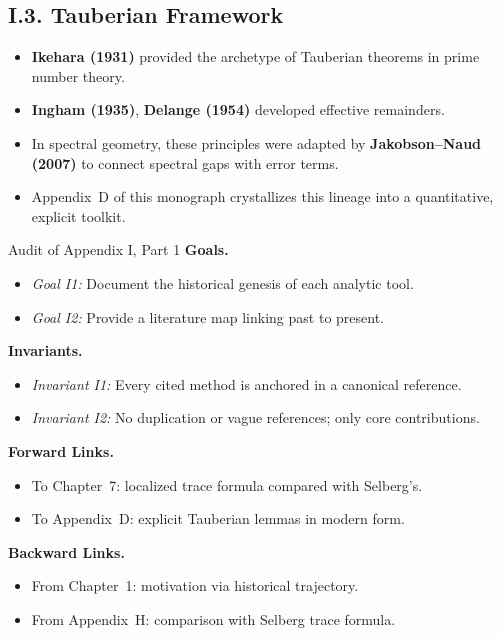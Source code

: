 \subsection*{I.3. Tauberian Framework}  
\begin{itemize}
  \item \textbf{Ikehara (1931)} provided the archetype of Tauberian theorems in prime number theory.  
  \item \textbf{Ingham (1935)}, \textbf{Delange (1954)} developed effective remainders.  
  \item In spectral geometry, these principles were adapted by \textbf{Jakobson–Naud (2007)} to connect spectral gaps with error terms.  
  \item Appendix~D of this monograph crystallizes this lineage into a quantitative, explicit toolkit.  
\end{itemize}

\begin{auditblock}{Audit of Appendix I, Part 1}
\noindent\textbf{Goals.}  
\begin{itemize}
  \item \emph{Goal I1:} Document the historical genesis of each analytic tool.  
  \item \emph{Goal I2:} Provide a literature map linking past to present.  
\end{itemize}

\noindent\textbf{Invariants.}  
\begin{itemize}
  \item \emph{Invariant I1:} Every cited method is anchored in a canonical reference.  
  \item \emph{Invariant I2:} No duplication or vague references; only core contributions.  
\end{itemize}

\noindent\textbf{Forward Links.}  
\begin{itemize}
  \item To Chapter~7: localized trace formula compared with Selberg’s.  
  \item To Appendix~D: explicit Tauberian lemmas in modern form.  
\end{itemize}

\noindent\textbf{Backward Links.}  
\begin{itemize}
  \item From Chapter~1: motivation via historical trajectory.  
  \item From Appendix~H: comparison with Selberg trace formula.  
\end{itemize}
\end{auditblock}

